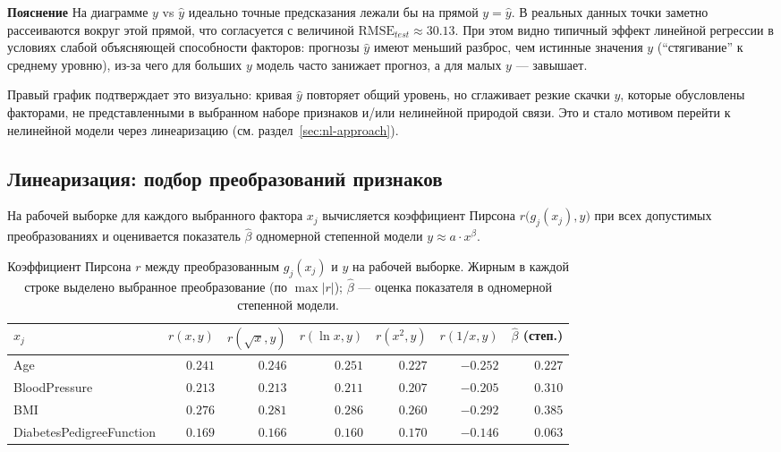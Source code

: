 \documentclass[a4paper, 14pt]{extarticle}
\begin{document}
\textbf{Пояснение} На диаграмме $y$ vs $\hat y$ идеально точные предсказания лежали бы на прямой $y=\hat y$. В реальных данных точки заметно рассеиваются вокруг этой прямой, что согласуется с величиной $\mathrm{RMSE}_{test}\approx 30.13$. При этом видно типичный эффект линейной регрессии в условиях слабой объясняющей способности факторов: прогнозы $\hat y$ имеют меньший разброс, чем истинные значения $y$ (``стягивание'' к среднему уровню), из-за чего для больших $y$ модель часто занижает прогноз, а для малых $y$ --- завышает.

\medskip
Правый график подтверждает это визуально: кривая $\hat y$ повторяет общий уровень, но сглаживает резкие скачки $y$, которые обусловлены факторами, не представленными в выбранном наборе признаков и/или нелинейной природой связи. Это и стало мотивом перейти к нелинейной модели через линеаризацию (см. раздел~\ref{sec:nl-approach}).

\subsection{Линеаризация: подбор преобразований признаков}\label{sec:nl-select}

На рабочей выборке для каждого выбранного фактора $x_j$ вычисляется коэффициент Пирсона
$r\bigl(g_j(x_j),y\bigr)$ при всех допустимых преобразованиях и оценивается показатель $\hat\beta$
одномерной степенной модели $y\approx a\cdot x^{\beta}$.

\begin{table}[H]
\centering\small
\begin{tabular}{lrrrrr|r}
\toprule
$x_j$ & $r(x,y)$ & $r(\sqrt{x},y)$ & $r(\ln x,y)$ & $r(x^2,y)$ & $r(1/x,y)$ & $\hat\beta$ (степ.) \\
\midrule
Age & $0.241$ & $0.246$ & $0.251$ & $0.227$ & $-0.252$ & $0.227$ \\
BloodPressure & $0.213$ & $0.213$ & $0.211$ & $0.207$ & $-0.205$ & $0.310$ \\
BMI & $0.276$ & $0.281$ & $0.286$ & $0.260$ & $-0.292$ & $0.385$ \\
DiabetesPedigreeFunction & $0.169$ & $0.166$ & $0.160$ & $0.170$ & $-0.146$ & $0.063$ \\
\bottomrule
\end{tabular}
\caption{Коэффициент Пирсона $r$ между преобразованным $g_j(x_j)$ и $y$ на рабочей выборке.
Жирным в каждой строке выделено выбранное преобразование (по $\max|r|$);
$\hat\beta$ --- оценка показателя в одномерной степенной модели.}
\end{table}
\end{document}

